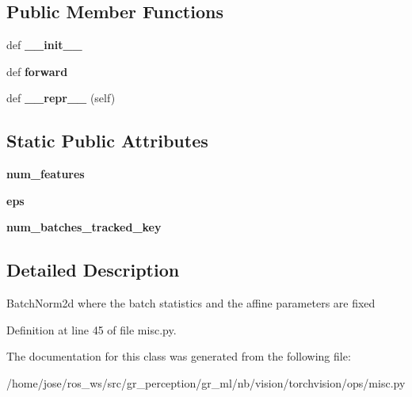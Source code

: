 \subsection*{Public Member Functions}
\begin{DoxyCompactItemize}
\item 
\mbox{\label{classtorchvision_1_1ops_1_1misc_1_1FrozenBatchNorm2d_ab29c26f584c46c1258ec56fb92e4a999}} 
def {\bfseries \+\_\+\+\_\+init\+\_\+\+\_\+}
\item 
\mbox{\label{classtorchvision_1_1ops_1_1misc_1_1FrozenBatchNorm2d_a31cfa41fca06df8788dad4633bd42d64}} 
def {\bfseries forward}
\item 
\mbox{\label{classtorchvision_1_1ops_1_1misc_1_1FrozenBatchNorm2d_a4e911c11f434188c48f298b14b545c1f}} 
def {\bfseries \+\_\+\+\_\+repr\+\_\+\+\_\+} (self)
\end{DoxyCompactItemize}
\subsection*{Static Public Attributes}
\begin{DoxyCompactItemize}
\item 
\mbox{\label{classtorchvision_1_1ops_1_1misc_1_1FrozenBatchNorm2d_ae01d0375636e612acde07712de6283da}} 
{\bfseries num\+\_\+features}
\item 
\mbox{\label{classtorchvision_1_1ops_1_1misc_1_1FrozenBatchNorm2d_a851a08417d47a27e4231f66f40c6c519}} 
{\bfseries eps}
\item 
\mbox{\label{classtorchvision_1_1ops_1_1misc_1_1FrozenBatchNorm2d_adadcd9980b847adcc573f8d9c837d3ee}} 
{\bfseries num\+\_\+batches\+\_\+tracked\+\_\+key}
\end{DoxyCompactItemize}


\subsection{Detailed Description}
\begin{DoxyVerb}BatchNorm2d where the batch statistics and the affine parameters
are fixed
\end{DoxyVerb}
 

Definition at line 45 of file misc.\+py.



The documentation for this class was generated from the following file\+:\begin{DoxyCompactItemize}
\item 
/home/jose/ros\+\_\+ws/src/gr\+\_\+perception/gr\+\_\+ml/nb/vision/torchvision/ops/misc.\+py\end{DoxyCompactItemize}
